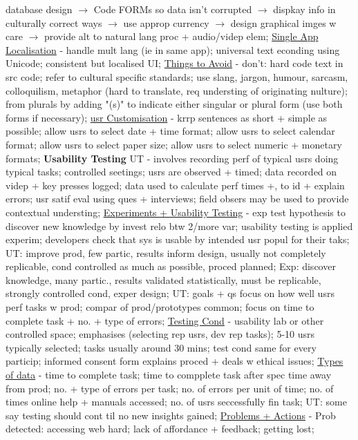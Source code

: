 \documentclass[a4paper]{article}
\begin{document}
\begin{multicols}{3}
        database design $\to$ Code FORMs so data isn't corrupted $\to$ dispkay info in culturally correct ways $\to$ use approp currency $\to$ design graphical imges w care $\to$ provide alt
        to natural lang proc + audio/videp elem; \underline{Single App Localisation} - handle mult lang (ie in same app); universal text econding using Unicode; consistent but localised UI;
        \underline{Things to Avoid} - don't: hard code text in src code; refer to cultural specific standards; use slang, jargon, humour, sarcasm, colloquilism, metaphor (hard to translate, req
        understing of originating nulture); from plurals by adding "(s)" to indicate either singular or plural form (use both forms if necessary); \underline{usr Customisation} - krrp
         sentences as short + simple as possible; allow usrs to select date + time format; allow usrs to select calendar format; allow usrs to select paper size; allow usrs to select numeric +
         monetary formats; \newline \textbf{Usability Testing} UT - involves recording perf of typical usrs doing typical tasks; controlled seetings; usrs are observed + timed; data
         recorded on videp + key presses logged; data used to calculate perf times +, to id + explain errors; usr satif eval using ques + interviews; field obsers may be
         used to provide contextual understing; \underline{Experiments + Usability Testing} - exp test hypothesis to discover new knowledge by invest relo btw 2/more var; usability testing is
         applied experim; developers check that sys is usable by intended usr popul for their taks; UT: improve prod, few partic, results inform design, usually not completely replicable, cond
         controlled as much as possible, proced planned; Exp: discover knowledge, many partic., results validated statistically, must be replicable, strongly controlled cond, exper design; UT: goals + qs
         focus on how well usrs perf tasks w prod; compar of prod/prototypes common; focus on time to complete task + no. + type of errors; \underline{Testing Cond} - usability lab or other controlled space; emphasises (selecting rep usrs, dev rep tasks);
         5-10 usrs typically selected; tasks usually around 30 mins; test cond same for every particip; informed consent form explains proced + deals w ethical issues; \underline{Types of data} - time to
         complete task; time to compplete task after spec time away from prod; no. + type of errors per task; no. of errors per unit of time; no. of times online help + manuals accessed; no. of usrs
         seccessfully fin task; UT: some say testing should cont til no new insights gained; \underline{Problems + Actions} - Prob detected: accessing web hard; lack of affordance + feedback; getting lost;

\end{multicols}
\end{document}
